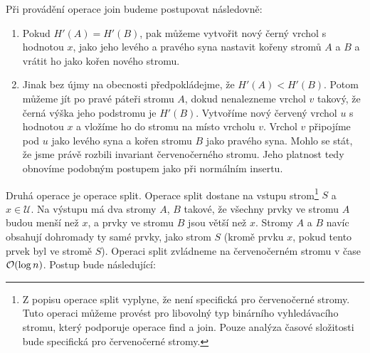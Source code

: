 Při provádění operace join budeme postupovat následovně:

\begin{enumerate}
\item Pokud $H'(A) = H'(B)$, pak můžeme vytvořit nový černý vrchol s hodnotou $x$, jako jeho levého a pravého syna nastavit kořeny stromů $A$ a $B$ a vrátit ho jako kořen nového stromu.
\item Jinak bez újmy na obecnosti předpokládejme, že $H'(A)<H'(B)$. Potom můžeme jít po pravé páteři stromu $A$, dokud nenalezneme vrchol $v$ takový, že černá výška jeho podstromu je $H'(B)$. Vytvoříme nový červený vrchol $u$ s hodnotou $x$ a vložíme ho do stromu na místo vrcholu $v$. Vrchol $v$ připojíme pod $u$ jako levého syna a kořen stromu $B$ jako pravého syna. Mohlo se stát, že jsme právě rozbili invariant červenočerného stromu. Jeho platnost tedy obnovíme podobným postupem jako při normálním insertu.
\end{enumerate}

Druhá operace je operace split. Operace split dostane na vstupu strom\footnote{Z popisu operace split vyplyne, že není specifická pro červenočerné stromy. Tuto operaci můžeme provést pro libovolný typ binárního vyhledávacího stromu, který podporuje operace find a join. Pouze analýza časové složitosti bude specifická pro červenočerné stromy.} $S$ a $x\in \mathcal U$. Na výstupu má dva stromy $A$, $B$ takové, že všechny prvky ve stromu $A$ budou menší než $x$, a prvky ve stromu $B$ jsou větší než $x$. Stromy $A$ a $B$ navíc obsahují dohromady ty samé prvky, jako strom $S$ (kromě prvku $x$, pokud tento prvek byl ve stromě $S$). Operaci split zvládneme na červenočerném stromu v čase $\mathcal O(\log n)$. Postup bude následující:

